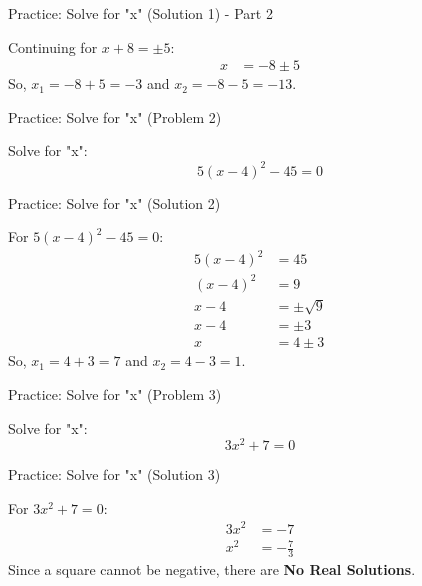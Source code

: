 \documentclass[aspectratio=169]{beamer}
\begin{document}
\begin{frame}{Practice: Solve for "x" (Solution 1) - Part 2}
    \begin{tcolorbox}[colback=lightgray,colframe=accent,title=Solution 1 - Part 2 (Cont.)]
        \footnotesize
        Continuing for $x+8 = \pm 5$:
        \begin{align*}
            x &= -8 \pm 5
        \end{align*}
        So, $x_1 = -8 + 5 = -3$ and $x_2 = -8 - 5 = -13$.
    \end{tcolorbox}
\end{frame}

\begin{frame}{Practice: Solve for "x" (Problem 2)}
    \begin{tcolorbox}[colback=lightgray,colframe=primary,title=Problem 2]
        \footnotesize
        Solve for "x":
        \[ 5(x-4)^2 - 45 = 0 \]
    \end{tcolorbox}
\end{frame}

\begin{frame}{Practice: Solve for "x" (Solution 2)}
    \begin{tcolorbox}[colback=lightgray,colframe=accent,title=Solution 2]
        \footnotesize
        For $5(x-4)^2 - 45 = 0$:
        \begin{align*}
            5(x-4)^2 &= 45 \\
            (x-4)^2 &= 9 \\
            x-4 &= \pm\sqrt{9} \\
            x-4 &= \pm 3 \\
            x &= 4 \pm 3
        \end{align*}
        So, $x_1 = 4 + 3 = 7$ and $x_2 = 4 - 3 = 1$.
    \end{tcolorbox}
\end{frame}

\begin{frame}{Practice: Solve for "x" (Problem 3)}
    \begin{tcolorbox}[colback=lightgray,colframe=primary,title=Problem 3]
        \footnotesize
        Solve for "x":
        \[ 3x^2 + 7 = 0 \]
    \end{tcolorbox}
\end{frame}

\begin{frame}{Practice: Solve for "x" (Solution 3)}
    \begin{tcolorbox}[colback=lightgray,colframe=accent,title=Solution 3]
        \footnotesize
        For $3x^2 + 7 = 0$:
        \begin{align*}
            3x^2 &= -7 \\
            x^2 &= -\frac{7}{3}
        \end{align*}
        Since a square cannot be negative, there are \textbf{No Real Solutions}.
    \end{tcolorbox}
\end{frame}
\end{document}
